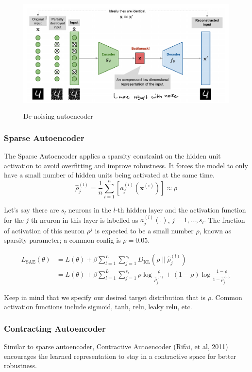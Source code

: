 \documentclass[main]{subfiles}
\begin{document}
\begin{figure}[H]
	\centering
	\includegraphics[width=0.8\linewidth]{07_UnsupervisedAndSelfsupervisedLearning/figures/autoencoder-denoise.png}
	\label{fig:autoencoder-denoise}
	\caption{De-noising autoencoder}
\end{figure}

\subsubsection{Sparse Autoencoder}
The Sparse Autoencoder applies a sparsity constraint on the hidden unit activation to avoid overfitting and improve robustness. It forces the model to only have a small number of hidden units being activated at the same time.
\begin{equation}
    \hat{\rho}_j^{(l)} = \frac{1}{n} \sum_{i=1}^n [a_j^{(l)}(\mathbf{x}^{(i)})] \approx \rho
\end{equation}

Let’s say there are $s_l$ neurons in the $l$-th hidden layer and the activation function for the $j$-th neuron in this layer is labelled as $a^{(l)}_j(.)$, $j=1,…,s_l.$ The fraction of activation of this neuron $\rho^j$ is expected to be a small number $\rho$, known as sparsity parameter; a common config is $\rho=0.05$. 

\begin{align}
L_\text{SAE}(\theta) 
&= L(\theta) + \beta \sum_{l=1}^L \sum_{j=1}^{s_l} D_\text{KL}(\rho \| \hat{\rho}_j^{(l)}) \\
&= L(\theta) + \beta \sum_{l=1}^L \sum_{j=1}^{s_l} \rho\log\frac{\rho}{\hat{\rho}_j^{(l)}} + (1-\rho)\log\frac{1-\rho}{1-\hat{\rho}_j^{(l)}}
\end{align}

Keep in mind that we specify our desired target distribution that is $\rho$. Common activation functions include sigmoid, tanh, relu, leaky relu, etc. 

\subsubsection{Contracting Autoencoder}
Similar to sparse autoencoder, Contractive Autoencoder (Rifai, et al, 2011) encourages the learned representation to stay in a contractive space for better robustness.
\end{document}
